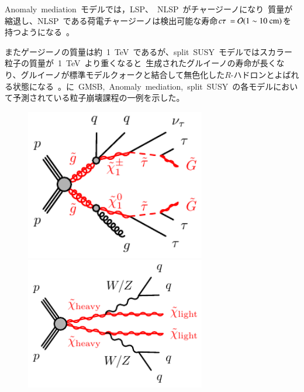 Anomaly~mediation~モデルでは，LSP、~NLSP~がチャージーノになり~質量が縮退し、NLSP~である荷電チャージーノは検出可能な寿命$c\tau~=\mathcal{O}(\rm{1}\sim\rm{10}~\rm{cm})$を持つようになる~\cite{AR:12f}。

またゲージーノの質量は約~1~TeV~であるが、split~SUSY~モデルではスカラー粒子の質量が~1~TeV~より重くなると~生成されたグルイーノの寿命が長くなり、グルイーノが標準モデルクォークと結合して無色化した$R$-ハドロンとよばれる状態になる~\cite{AR:12c}。に~GMSB,~Anomaly~mediation,~split~SUSY~の各モデルにおいて予測されている粒子崩壊課程の一例を示した。

\begin{figure}[tbp]
	\begin{minipage}{0.49\hsize}
	\centering
    \includegraphics[width=0.7\textwidth]{img/diagram/gogo-qqgtautautauvGG-GMSB.pdf}
    \subcaption{}
    \end{minipage}
    \begin{minipage}{0.49\hsize}
    \centering
    \includegraphics[width=0.7\textwidth]{img/diagram/chichi-qqqq-XX.pdf}
    \subcaption{}
    \end{minipage}\\

\end{figure}
